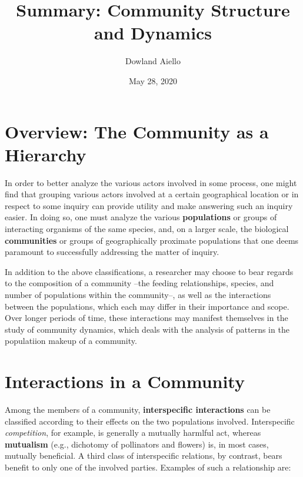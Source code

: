 \message{ !name(chapter_37.tex)}\documentclass{article}
\begin{document}

\title{Summary: Community Structure and Dynamics}
\author{Dowland Aiello}
\date{May 28, 2020}

\maketitle
\tableofcontents
\fancyhf{}

\newpage

\section{Overview: The Community as a Hierarchy}

In order to better analyze the various actors involved in some process, one might find that grouping various
actors involved at a certain geographical location or in respect to some inquiry can provide utility and make
answering such an inquiry easier. In doing so, one must analyze the various \textbf{populations} or groups of
interacting organisms of the same species, and, on a larger scale, the biological \textbf{communities} or groups
of geographically proximate populations that one deems paramount to successfully addressing the matter of inquiry.

In addition to the above classifications, a researcher may choose to bear regards to the composition of a community
--the feeding relationships, species, and number of populations within the community--, as well as the interactions
between the populations, which each may differ in their importance and scope. Over longer periods of time, these
interactions may manifest themselves in the study of community dynamics, which deals with the analysis of patterns
in the populatiion makeup of a community.

\section{Interactions in a Community}

Among the members of a community, \textbf{interspecific interactions} can be classified according to their effects
on the two populations involved. Interspecific \emph{competition}, for example, is generally a mutually harmlful
act, whereas \textbf{mutualism} (e.g., dichotomy of pollinators and flowers) is, in most cases, mutually
beneficial. A third class of interspecific relations, by contrast, bears benefit to only one of the involved
parties. Examples of such a relationship are:
\end{document}
